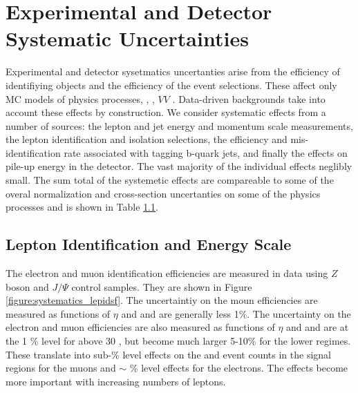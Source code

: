 \section{Experimental and Detector Systematic Uncertainties}

Experimental and detector sysetmatics uncertanties arise from the efficiency of identifiying objects and the efficiency of the event selections. These affect only MC models of physics processes, \ttV, \tth, $VV$ . Data-driven backgrounds take into account these effects by construction. We consider systematic effects from a number of sources: the lepton and jet energy and momentum scale measurements, the lepton identification and isolation selections, the efficiency and mis-identification rate associated with tagging b-quark jets, and finally the effects on pile-up energy in the detector. The vast majority of the individual effects neglibly small. The sum total of the systemetic effects are compareable to some of the overal normalization and cross-section uncertanties on some of the physics processes and is shown in Table \ref{}. 

\subsection{Lepton Identification and Energy Scale}
The electron\cite{ATLAS-CONF-2014-032} and muon identification efficiencies\cite{MuonSF} are measured in data using $Z$ boson and $J/\Psi$ control samples. They are shown in Figure \ref{figure:systematics_lepidsf}. The uncertaintiy on the moun efficiencies are measured as functions of $\eta$ and \pt and are generally less 1\%. The uncertainty on the electron and muon efficiencies are also measured as functions of $\eta$ and \pt and are at the 1 \% level for \pt above 30 \gevc, but become much larger 5-10\% for the lower \pt regimes.   These translate into sub-\% level effects on the \ttV and \tth event counts in the signal regions for the muons and $\sim$ \% level effects for the electrons. The effects become more important with increasing numbers of leptons.  

